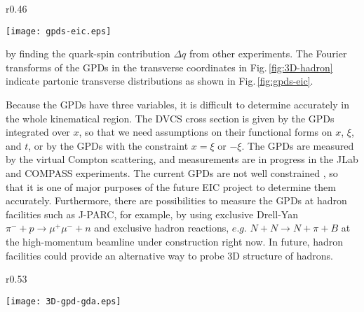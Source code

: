 \documentclass{PoS}
\begin{document}
\begin{wrapfigure}[11]{r}{0.46\textwidth}
   \vspace{-0.4cm} 
   \begin{center}
     \texttt{[image: gpds-eic.eps]}
\vspace{-0.80cm}
\caption{GPD studies at EIC \cite{eic-2016}.}
\label{fig:gpds-eic}
   \end{center}
\end{wrapfigure}

\noindent
by finding the quark-spin 
contribution $\Delta q$ from other experiments. 
The Fourier transforms of the GPDs in the transverse coordinates
in Fig.\,\ref{fig:3D-hadron}
indicate partonic transverse distributions as shown
in Fig.\,\ref{fig:gpds-eic}.

Because the GPDs have three variables, it is difficult to determine
accurately in the whole kinematical region. The DVCS cross section
is given by the GPDs integrated over $x$, so that we need assumptions
on their functional forms on $x$, $\xi$, and $t$, or by the GPDs
with the constraint $x=\xi$ or $-\xi$.
The GPDs are measured by the virtual Compton scattering,
and measurements are in progress in the JLab and COMPASS experiments.
The current GPDs are not well constrained \cite{gpds}, 
so that it is one of major purposes of the future EIC project 
to determine them accurately.
Furthermore, there are possibilities to measure the GPDs
at hadron facilities such as J-PARC, for example, by using
exclusive Drell-Yan $\pi^- + p \to \mu^+ \mu^- + n$
and exclusive hadron reactions, $e.g.$ $N+N \to N + \pi + B$
\cite{j-parc-gpds}
at the high-momentum beamline under construction right now.
In future, hadron facilities could provide an alternative
way to probe 3D structure of hadrons.

\begin{wrapfigure}[9]{r}{0.53\textwidth}
    \hspace{-0.40cm}
\begin{minipage}[c]{0.50\textwidth}
    \vspace{-0.20cm}
   \begin{center}
     \texttt{[image: 3D-gpd-gda.eps]}
   \end{center}
\vspace{-0.60cm}
\caption{GPDs and GDAs.}
\label{fig:3D-gpd-gda}
\vspace{-0.60cm}
\end{minipage}
\end{wrapfigure}
\end{document}
